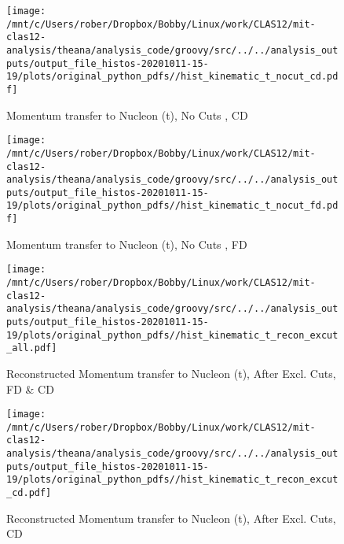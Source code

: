 \documentclass{article}
\begin{document}
\begin{landscape}
    \begin{figure}[h]
        \centering

        \texttt{[image: /mnt/c/Users/rober/Dropbox/Bobby/Linux/work/CLAS12/mit-clas12-analysis/theana/analysis\_code/groovy/src/../../analysis\_outputs/output\_file\_histos-20201011-15-19/plots/original\_python\_pdfs//hist\_kinematic\_t\_nocut\_cd.pdf]}
        \captionsetup{textformat=empty,labelformat=blank}
        \caption{Momentum transfer to Nucleon (t), No Cuts , CD}
    \end{figure}
    \clearpage
    
    \begin{figure}[h]
        \centering

        \texttt{[image: /mnt/c/Users/rober/Dropbox/Bobby/Linux/work/CLAS12/mit-clas12-analysis/theana/analysis\_code/groovy/src/../../analysis\_outputs/output\_file\_histos-20201011-15-19/plots/original\_python\_pdfs//hist\_kinematic\_t\_nocut\_fd.pdf]}
        \captionsetup{textformat=empty,labelformat=blank}
        \caption{Momentum transfer to Nucleon (t), No Cuts , FD}
    \end{figure}
    \clearpage
    
    \begin{figure}[h]
        \centering

        \texttt{[image: /mnt/c/Users/rober/Dropbox/Bobby/Linux/work/CLAS12/mit-clas12-analysis/theana/analysis\_code/groovy/src/../../analysis\_outputs/output\_file\_histos-20201011-15-19/plots/original\_python\_pdfs//hist\_kinematic\_t\_recon\_excut\_all.pdf]}
        \captionsetup{textformat=empty,labelformat=blank}
        \caption{Reconstructed Momentum transfer to Nucleon (t), After Excl. Cuts, FD \& CD}
    \end{figure}
    \clearpage
    
    \begin{figure}[h]
        \centering

        \texttt{[image: /mnt/c/Users/rober/Dropbox/Bobby/Linux/work/CLAS12/mit-clas12-analysis/theana/analysis\_code/groovy/src/../../analysis\_outputs/output\_file\_histos-20201011-15-19/plots/original\_python\_pdfs//hist\_kinematic\_t\_recon\_excut\_cd.pdf]}
        \captionsetup{textformat=empty,labelformat=blank}
        \caption{Reconstructed Momentum transfer to Nucleon (t), After Excl. Cuts, CD}
    \end{figure}
    \clearpage
    
    \begin{figure}[h]
        \centering


\end{figure}
\end{landscape}
\end{document}
